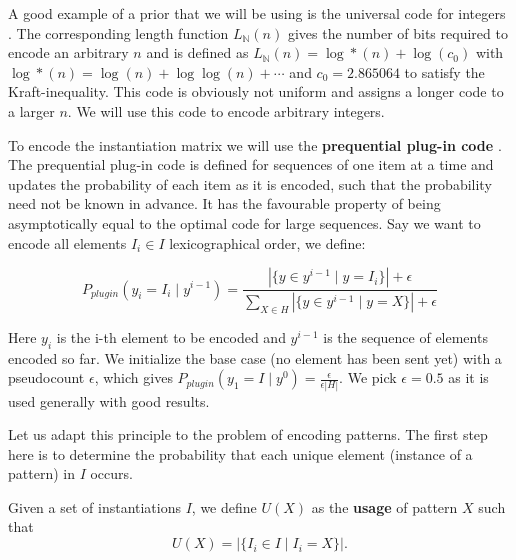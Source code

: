 \documentclass{llncs}
\begin{document}
A good example of a prior that we will be using is the universal code for integers \cite{integerprior}. The corresponding length function $L_{\mathbb{N}}(n)$ gives the number of bits required to encode an arbitrary $n$ and is defined as $L_{\mathbb{N}}(n) = \log*(n) + \log(c_0)$ with $\log*(n) = \log(n) + \log \log(n) + \cdots$ and $c_0=2.865064$ to satisfy the Kraft-inequality. This code is obviously not uniform and assigns a longer code to a larger $n$. We will use this code to encode arbitrary integers.

To encode the instantiation matrix we will use the \textbf{prequential plug-in code} \cite{ppcode}. The prequential plug-in code is defined for sequences of one item at a time and updates the probability of each item as it is encoded, such that the probability need not be known in advance. It has the favourable property of being asymptotically equal to the optimal code for large sequences. Say we want to encode all elements ${I}_i \in {I}$ lexicographical order, we define:
\begin{definition}\label{plugin}
$$
P_{plugin}( y_i = {I}_i \mid y^{i-1} ) = \frac{|\{y \in y^{i-1} \mid y = {I}_i\}| + \epsilon }{\sum_{X \in H}|\{y \in y^{i-1} \mid y = X\}| + \epsilon}
$$
\end{definition}
Here $y_i$ is the i-th element to be encoded and $y^{i-1}$ is the sequence of elements encoded so far. We initialize the base case (no element has been sent yet) with a pseudocount $\epsilon$, which gives $P_{plugin}( y_1 = {I} \mid y^{0} ) = \frac{\epsilon}{\epsilon|H|}$. We pick $\epsilon=0.5$ as it is used generally with good results.

Let us adapt this principle to the problem of encoding patterns. The first step here is to determine the probability that each unique element (instance of a pattern) in ${I}$ occurs. 

\begin{definition}\label{usage}
Given a set of instantiations ${I}$, we define $U(X)$ as the \textbf{usage} of pattern $X$ such that
$$
	U(X) = |\{ {I}_i \in {I} \mid {I}_i = X\}|.
$$
\end{definition}
\end{document}
